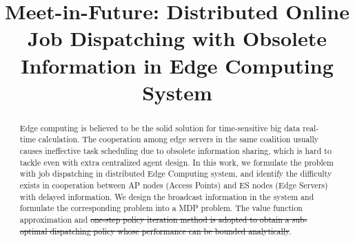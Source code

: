 \documentclass[10pt, conference, letterpaper]{IEEEtran}
\begin{document}
    \title{
        Meet-in-Future: Distributed Online Job Dispatching with Obsolete Information in Edge Computing System
    }
    \author{
    }
    \maketitle

    \begin{abstract}
        \label{sec:abstract}
        Edge computing is believed to be the solid solution for time-sensitive big data real-time calculation. The cooperation among edge servers in the same coalition usually causes ineffective task scheduling due to obsolete information sharing, which is hard to tackle even with extra centralized agent design. In this work, we formulate the problem with job dispatching in distributed Edge Computing system, and identify the difficulty exists in cooperation between AP nodes (Access Points) and ES nodes (Edge Servers) with delayed information. We design the broadcast information in the system and formulate the corresponding problem into a MDP problem. The value function approximation and \st{one-step policy iteration method is adopted to obtain a sub-optimal dispatching policy whose performance can be bounded analytically}.
    \end{abstract}

\end{document}
